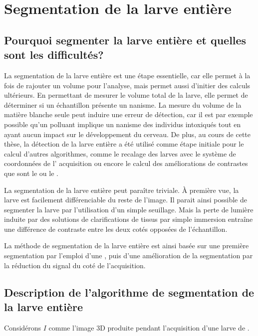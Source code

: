 \documentclass[\main/main.tex]{subfiles}
\begin{document}
\section{Segmentation de la larve entière}

\subsection{Pourquoi segmenter la larve entière et quelles sont les difficultés?}

%
La segmentation de la larve entière est une étape essentielle, car elle permet à la fois de rajouter un volume pour l'analyse, mais permet aussi d'initier des calculs ultérieurs.
%
En permettant de mesurer le volume total de la larve, elle permet de déterminer si un échantillon présente un nanisme.
%
La mesure du volume de la matière blanche seule peut induire une erreur de détection, car il est par exemple possible qu'un polluant implique un nanisme des individus intoxiqués tout en ayant aucun impact sur le développement du cerveau.
%
De plus, au cours de cette thèse, la détection de la larve entière a été utilisé comme étape initiale pour le calcul d'autres algorithmes, comme le recalage des larves avec le système de coordonnées de l' acquisition ou encore le calcul des améliorations de contrastes que sont le \sbddcc{} ou le \sblc{}.

%
La segmentation de la larve entière peut paraître triviale.
%
À première vue, la larve est facilement différenciable du reste de l'image.
%
Il parait ainsi possible de segmenter la larve par l'utilisation d'un simple seuillage.
%
Mais la perte de lumière induite par des solutions de clarifications de tissus par simple immersion entraîne une différence de contraste entre les deux cotés opposées de l'échantillon.

%
La méthode de segmentation de la larve entière est ainsi basée sur une première segmentation par l'emploi d'une \watershed{}, puis d'une amélioration de la segmentation par la réduction du signal du coté de l'acquisition.

\subsection{Description de l'algorithme de segmentation de la larve entière}

Considérons $I$ comme l'image 3D produite pendant l'acquisition d'une larve de \pz{}.
\end{document}
